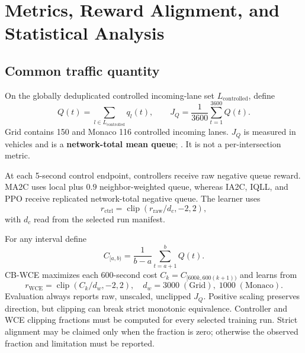 \chapter{Metrics, Reward Alignment, and Statistical Analysis}

\section{Common traffic quantity}
On the globally deduplicated controlled incoming-lane set $L_{\mathrm{controlled}}$, define
\[
Q(t)=\sum_{l\in L_{\mathrm{controlled}}}q_l(t),\qquad
J_Q=\frac{1}{3600}\sum_{t=1}^{3600}Q(t).
\]
Grid contains 150 and Monaco 116 controlled incoming lanes. $J_Q$ is measured in vehicles and is a \textbf{network-total mean queue}; \lowerbetter. It is not a per-intersection metric.

At each 5-second control endpoint, controllers receive raw negative queue reward. MA2C uses local plus $0.9$ neighbor-weighted queue, whereas IA2C, IQLL, and PPO receive replicated network-total negative queue. The learner uses
\[
r_{\mathrm{ctrl}}=\operatorname{clip}(r_{\mathrm{raw}}/d_c,-2,2),
\]
with $d_c$ read from the selected run manifest.

For any interval define
\[
C_{[a,b)}=\frac{1}{b-a}\sum_{t=a+1}^{b}Q(t).
\]
CB-WCE maximizes each 600-second cost $C_k=C_{[600k,600(k+1))}$ and learns from
\[
r_{\mathrm{WCE}}=\operatorname{clip}(C_k/d_w,-2,2),
\quad d_w=3000\;(\mathrm{Grid}),\;1000\;(\mathrm{Monaco}).
\]
Evaluation always reports raw, unscaled, unclipped $J_Q$. Positive scaling preserves direction, but clipping can break strict monotonic equivalence. Controller and WCE clipping fractions must be computed for every selected training run. Strict alignment may be claimed only when the fraction is zero; otherwise the observed fraction and limitation must be reported.

